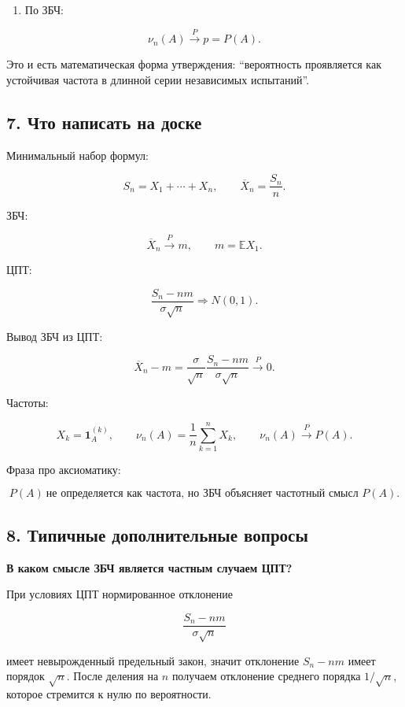 \documentclass[
  11pt,
  a4paper,
]{article}
\providecommand{\tightlist}{%
  \setlength{\itemsep}{0pt}\setlength{\parskip}{0pt}}
\begin{document}
\begin{enumerate}
\def\labelenumi{\arabic{enumi}.}
\setcounter{enumi}{3}
\tightlist
\item
  По ЗБЧ:
\end{enumerate}

\[
\nu_n(A)\xrightarrow{P}p=P(A).
\]

Это и есть математическая форма утверждения: ``вероятность проявляется
как устойчивая частота в длинной серии независимых испытаний''.

\subsection{7. Что написать на
доске}\label{ux447ux442ux43e-ux43dux430ux43fux438ux441ux430ux442ux44c-ux43dux430-ux434ux43eux441ux43aux435}

Минимальный набор формул:

\[
S_n=X_1+\cdots+X_n,
\qquad
\overline X_n=\frac{S_n}{n}.
\]

ЗБЧ:

\[
\overline X_n\xrightarrow{P}m,
\qquad
m=\mathbb EX_1.
\]

ЦПТ:

\[
\frac{S_n-nm}{\sigma\sqrt n}
\Rightarrow
N(0,1).
\]

Вывод ЗБЧ из ЦПТ:

\[
\overline X_n-m
=
\frac{\sigma}{\sqrt n}
\frac{S_n-nm}{\sigma\sqrt n}
\xrightarrow{P}0.
\]

Частоты:

\[
X_k=\mathbf 1_A^{(k)},
\qquad
\nu_n(A)=\frac{1}{n}\sum_{k=1}^nX_k,
\qquad
\nu_n(A)\xrightarrow{P}P(A).
\]

Фраза про аксиоматику:

\[
P(A)\ \text{не определяется как частота, но ЗБЧ объясняет частотный смысл }P(A).
\]

\subsection{8. Типичные дополнительные
вопросы}\label{ux442ux438ux43fux438ux447ux43dux44bux435-ux434ux43eux43fux43eux43bux43dux438ux442ux435ux43bux44cux43dux44bux435-ux432ux43eux43fux440ux43eux441ux44b}

\textbf{В каком смысле ЗБЧ является частным случаем ЦПТ?}

При условиях ЦПТ нормированное отклонение

\[
\frac{S_n-nm}{\sigma\sqrt n}
\]

имеет невырожденный предельный закон, значит отклонение \(S_n-nm\) имеет
порядок \(\sqrt n\). После деления на \(n\) получаем отклонение среднего
порядка \(1/\sqrt n\), которое стремится к нулю по вероятности.
\end{document}
